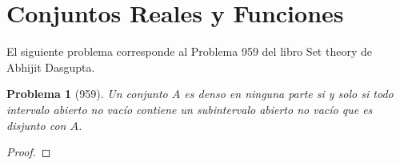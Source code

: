 \documentclass[a4,10pt]{aleph-notas}
\newtheorem*{prob}{Problema}
\begin{document}
\encabezado

\section{Conjuntos Reales y Funciones}

\noindent
El siguiente problema corresponde al Problema 959 del libro Set theory de Abhijit Dasgupta.

\begin{prob}[959]
    Un conjunto $A$ es denso en ninguna parte si y solo si todo intervalo abierto no vacío contiene un subintervalo abierto no vacío que es disjunto con $A$.
\end{prob}

\begin{proof}
    
\end{proof}
    
\end{document}
